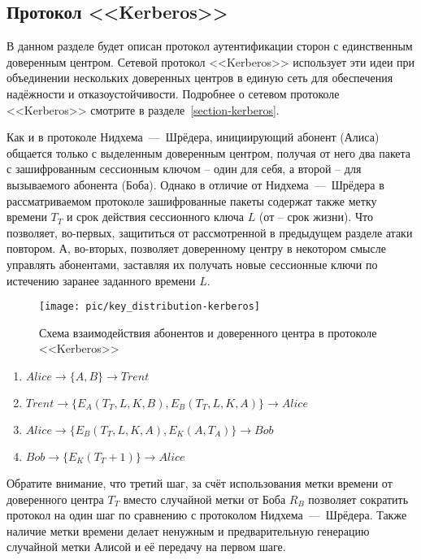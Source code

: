 \subsection{Протокол <<Kerberos>>}

В данном разделе будет описан протокол аутентификации сторон с единственным доверенным центром. Сетевой протокол <<Kerberos>> использует эти идеи при объединении нескольких доверенных центров в единую сеть для обеспечения надёжности и отказоустойчивости. Подробнее о сетевом протоколе <<Kerberos>> смотрите в разделе~\ref{section-kerberos}.

Как и в протоколе Нидхема~---~Шрёдера, инициирующий абонент (Алиса) общается только с выделенным доверенным центром, получая от него два пакета с зашифрованным сессионным ключом -- один для себя, а второй -- для вызываемого абонента (Боба). Однако в отличие от Нидхема~---~Шрёдера в рассматриваемом протоколе зашифрованные пакеты содержат также метку времени $T_T$ и срок действия сессионного ключа $L$ (от  -- срок жизни). Что позволяет, во-первых, защититься от рассмотренной в предыдущем разделе атаки повтором. А, во-вторых, позволяет доверенному центру в некотором смысле управлять абонентами, заставляя их получать новые сессионные ключи по истечению заранее заданного времени $L$.

\begin{figure}[!htb]
    \centering
    \texttt{[image: pic/key\_distribution-kerberos]}
    \caption{Схема взаимодействия абонентов и доверенного центра в протоколе <<Kerberos>>\label{fig:key_distribution-kerberos}}
\end{figure}

\begin{enumerate}
	\item $ Alice	\rightarrow \{ A, B \}									\rightarrow Trent $
	\item $ Trent	\rightarrow \{ E_A \left( T_T, L, K, B \right), E_B \left( T_T, L, K, A \right) \}	\rightarrow Alice $
	\item $ Alice	\rightarrow \{ E_B \left( T_T, L, K, A \right), E_K \left( A, T_A \right) \}		\rightarrow Bob $
	\item $ Bob	\rightarrow \{ E_K \left( T_T + 1 \right) \}						\rightarrow Alice $
\end{enumerate}

Обратите внимание, что третий шаг, за счёт использования метки времени от доверенного центра $T_T$ вместо случайной метки от Боба $R_B$ позволяет сократить протокол на один шаг по сравнению с протоколом Нидхема~---~Шрёдера. Также наличие метки времени делает ненужным и предварительную генерацию случайной метки Алисой и её передачу на первом шаге.

